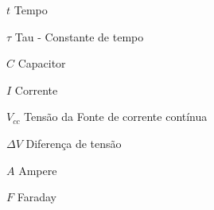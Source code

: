\begin{simbolos}
  \item[$t$] Tempo
  \item[$\tau$] Tau - Constante de tempo
  \item[$C$] Capacitor
  \item[$I$] Corrente
  \item[$V_{cc}$] Tensão da Fonte de corrente contínua
  \item[$\Delta V$] Diferença de tensão
  \item[$A$] Ampere
  \item[$F$] Faraday
\end{simbolos}

\tableofcontents*
\cleardoublepage
